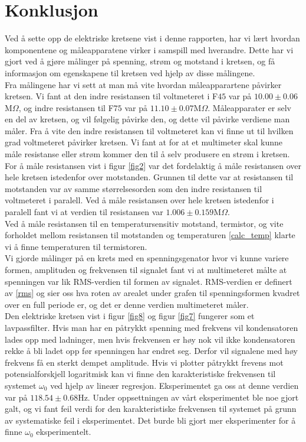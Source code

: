 \documentclass[%
 reprint,
nofootinbib,
aps,
]{revtex4-1}
\begin{document}
\section{Konklusjon}
Ved å sette opp de elektriske kretsene vist i denne rapporten, har vi lært hvordan komponentene og måleapparatene virker i samspill med hverandre. Dette har vi gjort ved å gjøre målinger på spenning, strøm og motstand i kretsen, og få informasjon om egenskapene til kretsen ved hjelp av disse målingene. \\
Fra målingene har vi sett at man må vite hvordan måleapparartene påvirker kretsen. Vi fant at den indre resistansen til voltmeteret i F$45$ var på $10.00 \pm 0.06$M$\Omega$, og indre resistansen til F$75$ var på $11.10 \pm 0.07$M$\Omega$. Måleapparater er selv en del av kretsen, og vil følgelig påvirke den, og dette vil påvirke verdiene man måler. Fra å vite den indre resistansen til voltmeteret kan vi finne ut til hvilken grad voltmeteret påvirker kretsen. Vi fant at for at et multimeter skal kunne måle resistanse eller strøm kommer den til å selv produsere en strøm i kretsen. \\For å måle resistansen vist i figur \ref{fig2} var det fordelaktig å måle resistansen over hele kretsen istedenfor over motstanden. Grunnen til dette var at resistansen til motstanden var av samme størrelsesorden som den indre resistansen til voltmeteret i paralell. Ved å måle resistansen over hele kretsen istedenfor i paralell fant vi at verdien til resistansen var $1.006\pm0.159$M$\Omega$. \\
Ved å måle resistansen til en temperatursensitiv motstand, termistor, og vite forholdet mellom resistansen til motstanden og temperaturen \eqref{calc_temp} klarte vi å finne temperaturen til termistoren. \\
Vi gjorde målinger på en krets med en spenningsgenator hvor vi kunne variere formen, amplituden og frekvensen til signalet fant vi at multimeteret målte at spenningen var lik RMS-verdien til formen av signalet. RMS-verdien er definert av \eqref{rms} og sier oss hva roten av arealet under grafen til spenningsformen kvadret over en full periode er, og det er denne verdien multimeteret måler. \\
Den elektriske kretsen vist i figur \ref{fig8} og figur \ref{fig7} fungerer som et lavpassfilter. Hvis man har en påtrykkt spenning med frekvens vil kondensatoren lades opp med ladninger, men hvis frekvensen er høy nok vil ikke kondensatoren rekke å bli ladet opp før spenningen har endret seg. Derfor vil signalene med høy frekvens få en sterkt dempet amplitude. Hvis vi plotter påtrykkt frevens mot potensialforskjell logaritmisk kan vi finne den karakteristiske frekvensen til systemet $\omega_0$ ved hjelp av lineær regresjon. Eksperimentet ga oss at denne verdien var på $118.54 \pm 0.68$Hz. Under oppsettningen av vårt eksperimentet ble noe gjort galt, og vi fant feil verdi for den karakteristiske frekvensen til systemet på grunn av systematiske feil i eksperimentet. Det burde bli gjort mer eksperimenter for å finne $\omega_0$ eksperimentelt.
\end{document}
